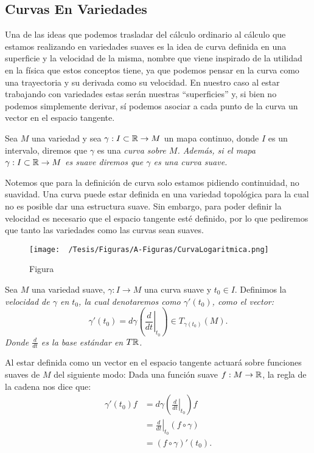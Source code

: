 \subsection{Curvas En Variedades}\label{Subsección: Curvas En Variedades}
Una de las ideas que podemos trasladar del cálculo ordinario al cálculo que estamos realizando en variedades suaves es la idea de curva definida en una superficie y la velocidad de la misma, nombre que viene inspirado de la utilidad en la física que estos conceptos tiene, ya que podemos pensar en la curva como una trayectoria y su derivada como su velocidad.
En nuestro caso al estar trabajando con variedades estas serán nuestras \enquote{superficies} y, si bien no podemos simplemente derivar, sí podemos asociar a cada punto de la curva un vector en el espacio tangente.

\begin{definition}
  \label{Definición: Curva en Variedades}
	Sea $M$ una variedad y sea $\gamma: I \subset \mathbb{R} \to M$ un mapa continuo, donde $I$ es un intervalo, diremos que $\gamma$ es una \it{curva sobre $M$}. Además, si el mapa $\gamma: I \subset \mathbb{R} \to M$ es suave diremos que $\gamma$ es una curva suave.
\end{definition}

Notemos que para la definición de curva solo estamos pidiendo continuidad, no suavidad. Una curva puede estar definida en una variedad topológica para la cual no es posible dar una estructura suave. Sin embargo, para poder definir la velocidad es necesario que el espacio tangente esté definido, por lo que pediremos que tanto las variedades como las curvas sean suaves.

\begin{figure}[h]
  \centering
  \texttt{[image: ~/Tesis/Figuras/A-Figuras/CurvaLogaritmica.png]}
  \caption{Figura}
\end{figure}


\begin{definition}
	Sea $M$ una variedad suave, $\gamma: I \to M$ una curva suave y $t_0 \in I$. Definimos la \it{velocidad de $\gamma$ en $t_0$}, la cual denotaremos como $\gamma'(t_0)$, como el vector:
	\[
		\gamma'(t_0)
		=
		d\gamma\left( \left.  \frac{d}{dt}\right|_{t_0} \right)
		\in
		T_{\gamma(t_0)}(M).
	\]
	Donde $\frac{d}{dt}$ es la base estándar en $T\mathbb{R}$.
\end{definition}

Al estar definida como un vector en el espacio tangente actuará sobre funciones suaves de $M$ del siguiente modo: Dada una función suave $f: M \to \mathbb{R}$, la regla de la cadena nos dice que:
\begin{align*}
	\gamma'(t_0) f & =d\gamma\left(\left.\frac{d}{dt}\right|_{t_0} \right)f \\
	               & = \left. \frac{d}{dt} \right|_{t_0} (f \circ \gamma)   \\
	               & = (f \circ \gamma)' (t_0).
\end{align*}

